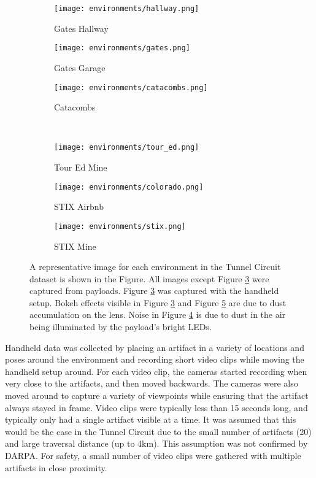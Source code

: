 \begin{figure}
	\centering
	\begin{subfigure}{0.3\textwidth}
		\texttt{[image: environments/hallway.png]}
		\caption{Gates Hallway}
		\label{environment_hallway}
	\end{subfigure}		
	\hfill
	\begin{subfigure}{0.3\textwidth}
		\texttt{[image: environments/gates.png]}
		\caption{Gates Garage}
		\label{environment_gates}		
	\end{subfigure}
	\hfill
	\begin{subfigure}{0.3\textwidth}
		\texttt{[image: environments/catacombs.png]}
		\caption{Catacombs}
		\label{environment_catacombs}
	\end{subfigure}
	\\
	\begin{subfigure}{0.3\textwidth}
		\texttt{[image: environments/tour\_ed.png]}
		\caption{Tour Ed Mine}
		\label{environment_tour_ed}
	\end{subfigure}		
	\hfill
	\begin{subfigure}{0.3\textwidth}
		\texttt{[image: environments/colorado.png]}
		\caption{STIX Airbnb}
		\label{environment_colorado}		
	\end{subfigure}
	\hfill
	\begin{subfigure}{0.3\textwidth}
		\texttt{[image: environments/stix.png]}
		\caption{STIX Mine}
		\label{environment_stix}
	\end{subfigure}	
	\caption[Representative dataset collection environment images]{A representative image for each environment in the Tunnel Circuit dataset is shown in the Figure. All images except Figure \ref{environment_catacombs} were captured from payloads. Figure \ref{environment_catacombs} was captured with the handheld setup. Bokeh effects visible in Figure \ref{environment_catacombs} and Figure \ref{environment_colorado} are due to dust accumulation on the lens. Noise in Figure \ref{environment_tour_ed} is due to dust in the air being illuminated by the payload's bright LEDs.}
	\label{environments}
\end{figure}

Handheld data was collected by placing an artifact in a variety of locations and poses around the environment and recording short video clips while moving the handheld setup around. For each video clip, the cameras started recording when very close to the artifacts, and then moved backwards. The cameras were also moved around to capture a variety of viewpoints while ensuring that the artifact always stayed in frame. Video clips were typically less than 15 seconds long, and typically only had a single artifact visible at a time. It was assumed that this would be the case in the Tunnel Circuit due to the small number of artifacts (20) and large traversal distance (up to 4km). This assumption was not confirmed by DARPA. For safety, a small number of video clips were gathered with multiple artifacts in close proximity. 

